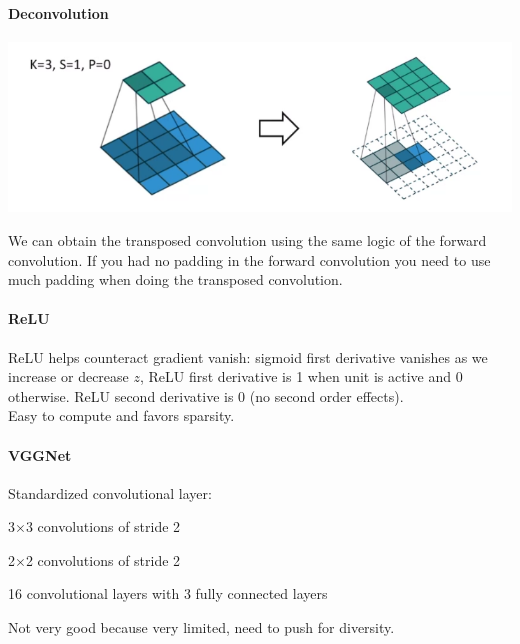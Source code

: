 \documentclass[10pt]{report}
\begin{document}
\paragraph{Deconvolution}
\begin{center}
	\includegraphics[scale=0.5]{63.png}
\end{center}
We can obtain the transposed convolution using the same logic of the forward convolution. If you had no padding in the forward convolution you need to use much padding when doing the transposed convolution.
\paragraph{ReLU} ReLU helps counteract gradient vanish: sigmoid first derivative vanishes as we increase or decrease $z$, ReLU first derivative is 1 when unit is active and 0 otherwise. ReLU second derivative is 0 (no second order effects).\\
Easy to compute and favors sparsity.
\paragraph{VGGNet} Standardized convolutional layer:
\begin{list}{}{}
	\item 3$\times$3 convolutions of stride 2
	\item 2$\times$2 convolutions of stride 2
	\item 16 convolutional layers with 3 fully connected layers
\end{list}
Not very good because very limited, need to push for diversity. 
\end{document}
